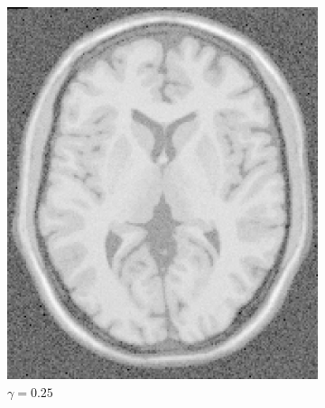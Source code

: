 \documentclass[11pt,twocolumn,twoside]{opticajnl}
\begin{document}
\begin{figure}[H]
    \centering
         \begin{subfigure}[h]{0.32\linewidth}
            \centering
            \includegraphics[width=\textwidth]{Figuras/ImageA_exp_gamma=0.25.png}
            \caption{$\gamma = 0.25$} 
         \end{subfigure}
         \begin{subfigure}[h]{0.32\linewidth}
            \centering

\end{subfigure}
\end{figure}
\end{document}

